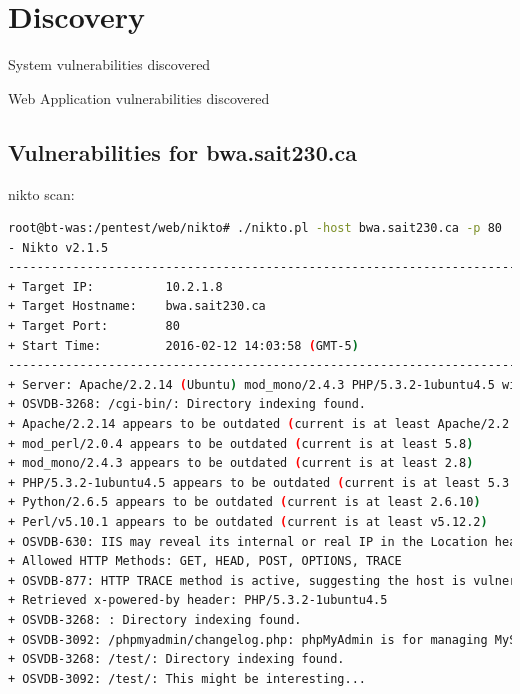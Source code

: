 \documentclass{article}
\begin{document}
\newpage
\section{Discovery}

System vulnerabilities discovered


Web Application vulnerabilities discovered


\subsection{Vulnerabilities for bwa.sait230.ca}

nikto scan:

\begin{lstlisting}[language=Bash]
root@bt-was:/pentest/web/nikto# ./nikto.pl -host bwa.sait230.ca -p 80
- Nikto v2.1.5
---------------------------------------------------------------------------
+ Target IP:          10.2.1.8
+ Target Hostname:    bwa.sait230.ca
+ Target Port:        80
+ Start Time:         2016-02-12 14:03:58 (GMT-5)
---------------------------------------------------------------------------
+ Server: Apache/2.2.14 (Ubuntu) mod_mono/2.4.3 PHP/5.3.2-1ubuntu4.5 with Suhosin-Patch mod_python/3.3.1 Python/2.6.5 mod_perl/2.0.4 Perl/v5.10.1
+ OSVDB-3268: /cgi-bin/: Directory indexing found.
+ Apache/2.2.14 appears to be outdated (current is at least Apache/2.2.19). Apache 1.3.42 (final release) and 2.0.64 are also current.
+ mod_perl/2.0.4 appears to be outdated (current is at least 5.8)
+ mod_mono/2.4.3 appears to be outdated (current is at least 2.8)
+ PHP/5.3.2-1ubuntu4.5 appears to be outdated (current is at least 5.3.6)
+ Python/2.6.5 appears to be outdated (current is at least 2.6.10)
+ Perl/v5.10.1 appears to be outdated (current is at least v5.12.2)
+ OSVDB-630: IIS may reveal its internal or real IP in the Location header via a request to the /images directory. The value is "http://127.0.0.1/images/".
+ Allowed HTTP Methods: GET, HEAD, POST, OPTIONS, TRACE 
+ OSVDB-877: HTTP TRACE method is active, suggesting the host is vulnerable to XST
+ Retrieved x-powered-by header: PHP/5.3.2-1ubuntu4.5
+ OSVDB-3268: : Directory indexing found.
+ OSVDB-3092: /phpmyadmin/changelog.php: phpMyAdmin is for managing MySQL databases, and should be protected or limited to authorized hosts.
+ OSVDB-3268: /test/: Directory indexing found.
+ OSVDB-3092: /test/: This might be interesting...

\end{lstlisting}
\end{document}
